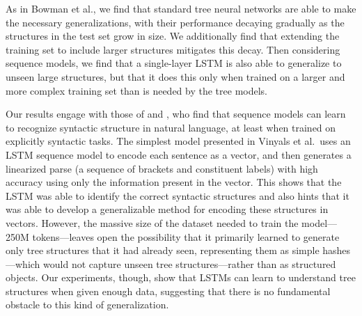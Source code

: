 As in Bowman et al., we find that standard tree neural networks are able to make the necessary generalizations, with their performance decaying gradually as the structures in the test set grow in size. We additionally find that extending the training set to include larger structures mitigates this decay. Then considering sequence models, we find that a single-layer LSTM is also able to generalize to unseen large structures, but that it does this only when trained on a larger and more complex training set than is needed by the tree models.

Our results engage with those of  and , who find that sequence models can learn to recognize syntactic structure in natural language, at least when trained on explicitly syntactic tasks. The simplest model presented in Vinyals et al.~uses an LSTM sequence model to encode each sentence as a vector, and then generates a linearized parse (a sequence of brackets and constituent labels) with high accuracy using only the information present in the vector. This shows that the LSTM was able to identify the correct syntactic structures and also hints that it was able to develop a generalizable method for encoding these structures in vectors. However, the massive size of the dataset needed to train the model---250M tokens---leaves open the possibility that it primarily learned to generate only tree structures that it had already seen, representing them as simple hashes---which would not capture unseen tree structures---rather than as structured objects.
Our experiments, though, show that LSTMs can learn to understand tree structures when given enough data, suggesting that there is no fundamental obstacle to this kind of generalization.